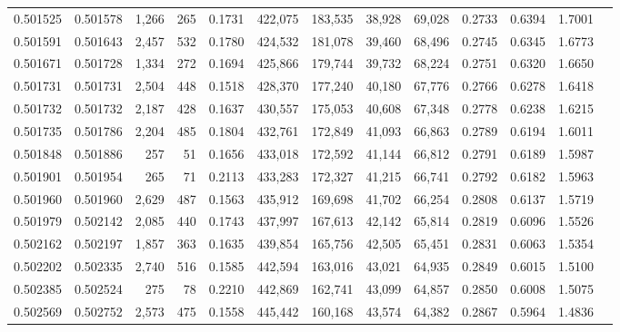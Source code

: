 \begin{tabular}{rrrrrrrrrrrrr}
0.501525 & 0.501578 & 1,266 &   265 &                                     0.1731 & 422,075 & 183,535 &  38,928 &  69,028 & 0.2733 & 0.6394 & 1.7001 \\
0.501591 & 0.501643 & 2,457 &   532 &                                     0.1780 & 424,532 & 181,078 &  39,460 &  68,496 & 0.2745 & 0.6345 & 1.6773 \\
0.501671 & 0.501728 & 1,334 &   272 &                                     0.1694 & 425,866 & 179,744 &  39,732 &  68,224 & 0.2751 & 0.6320 & 1.6650 \\
0.501731 & 0.501731 & 2,504 &   448 &                                     0.1518 & 428,370 & 177,240 &  40,180 &  67,776 & 0.2766 & 0.6278 & 1.6418 \\
0.501732 & 0.501732 & 2,187 &   428 &                                     0.1637 & 430,557 & 175,053 &  40,608 &  67,348 & 0.2778 & 0.6238 & 1.6215 \\
0.501735 & 0.501786 & 2,204 &   485 &                                     0.1804 & 432,761 & 172,849 &  41,093 &  66,863 & 0.2789 & 0.6194 & 1.6011 \\
0.501848 & 0.501886 &   257 &    51 &                                     0.1656 & 433,018 & 172,592 &  41,144 &  66,812 & 0.2791 & 0.6189 & 1.5987 \\
0.501901 & 0.501954 &   265 &    71 &                                     0.2113 & 433,283 & 172,327 &  41,215 &  66,741 & 0.2792 & 0.6182 & 1.5963 \\
0.501960 & 0.501960 & 2,629 &   487 &                                     0.1563 & 435,912 & 169,698 &  41,702 &  66,254 & 0.2808 & 0.6137 & 1.5719 \\
0.501979 & 0.502142 & 2,085 &   440 &                                     0.1743 & 437,997 & 167,613 &  42,142 &  65,814 & 0.2819 & 0.6096 & 1.5526 \\
0.502162 & 0.502197 & 1,857 &   363 &                                     0.1635 & 439,854 & 165,756 &  42,505 &  65,451 & 0.2831 & 0.6063 & 1.5354 \\
0.502202 & 0.502335 & 2,740 &   516 &                                     0.1585 & 442,594 & 163,016 &  43,021 &  64,935 & 0.2849 & 0.6015 & 1.5100 \\
0.502385 & 0.502524 &   275 &    78 &                                     0.2210 & 442,869 & 162,741 &  43,099 &  64,857 & 0.2850 & 0.6008 & 1.5075 \\
0.502569 & 0.502752 & 2,573 &   475 &                                     0.1558 & 445,442 & 160,168 &  43,574 &  64,382 & 0.2867 & 0.5964 & 1.4836 \\

\end{tabular}
